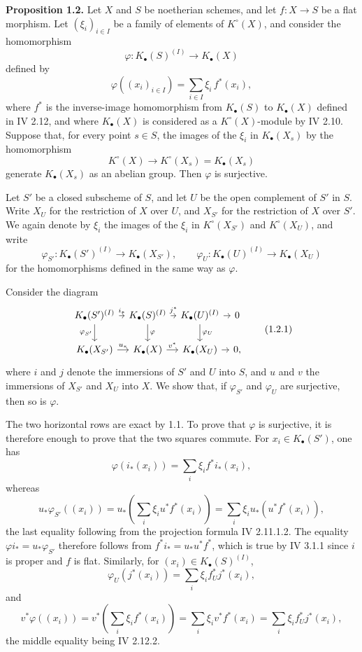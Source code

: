 \textbf{Proposition 1.2.} Let $X$ and $S$ be noetherian schemes, and let $f:X\to S$ be a flat morphism. Let $(\xi_i)_{i\in I}$ be a family of elements of $K^\circ(X)$, and consider the homomorphism
\[
 \varphi:K_\bullet(S)^{(I)}\longrightarrow K_\bullet(X)
\]
defined by
\[
 \varphi((x_i)_{i\in I})=\sum_{i\in I}\xi_i\,f^*(x_i),
\]
where $f^*$ is the inverse-image homomorphism from $K_\bullet(S)$ to $K_\bullet(X)$ defined in IV 2.12, and where $K_\bullet(X)$ is considered as a $K^\circ(X)$-module by IV 2.10. Suppose that, for every point $s\in S$, the images of the $\xi_i$ in $K_\bullet(X_s)$ by the homomorphism
\[
 K^\circ(X)\longrightarrow K^\circ(X_s)=K_\bullet(X_s)
\]
generate $K_\bullet(X_s)$ as an abelian group. Then $\varphi$ is surjective.

Let $S'$ be a closed subscheme of $S$, and let $U$ be the open complement of $S'$ in $S$. Write $X_U$ for the restriction of $X$ over $U$, and $X_{S'}$ for the restriction of $X$ over $S'$. We again denote by $\xi_i$ the images of the $\xi_i$ in $K^\circ(X_{S'})$ and $K^\circ(X_U)$, and write
\[
 \varphi_{S'}:K_\bullet(S')^{(I)}\to K_\bullet(X_{S'}),\qquad
 \varphi_U:K_\bullet(U)^{(I)}\to K_\bullet(X_U)
\]
for the homomorphisms defined in the same way as $\varphi$.

Consider the diagram
\[
\begin{tikzcd}[column sep=tiny]
K_\bullet(S')^{(I)} \arrow[r,"i_*"] \arrow[d,"\varphi_{S'}"'] &
K_\bullet(S)^{(I)} \arrow[r,"j^*"] \arrow[d,"\varphi"] &
K_\bullet(U)^{(I)} \arrow[r] \arrow[d,"\varphi_U"] & 0\\
K_\bullet(X_{S'}) \arrow[r,"u_*"] & K_\bullet(X) \arrow[r,"v^*"] & K_\bullet(X_U) \arrow[r] & 0,
\end{tikzcd}\tag{1.2.1}
\]
where $i$ and $j$ denote the immersions of $S'$ and $U$ into $S$, and $u$ and $v$ the immersions of $X_{S'}$ and $X_U$ into $X$. We show that, if $\varphi_{S'}$ and $\varphi_U$ are surjective, then so is $\varphi$.

The two horizontal rows are exact by 1.1. To prove that $\varphi$ is surjective, it is therefore enough to prove that the two squares commute. For $x_i\in K_\bullet(S')$, one has
\[
 \varphi(i_*(x_i))=\sum_i \xi_i f^*i_*(x_i),
\]
whereas
\[
 u_*\varphi_{S'}((x_i))=u_*\left(\sum_i\xi_i u^*f^*(x_i)\right)=\sum_i \xi_i u_*(u^*f^*(x_i)),
\]
the last equality following from the projection formula IV 2.11.1.2. The equality $\varphi i_*=u_*\varphi_{S'}$ therefore follows from $f^*i_*=u_*u^*f^*$, which is true by IV 3.1.1 since $i$ is proper and $f$ is flat. Similarly, for $(x_i)\in K_\bullet(S)^{(I)}$,
\[
 \varphi_U(j^*(x_i))=\sum_i\xi_i f_U^*j^*(x_i),
\]
and
\[
 v^*\varphi((x_i))=v^*\left(\sum_i\xi_i f^*(x_i)\right)=\sum_i\xi_i v^*f^*(x_i)=\sum_i\xi_i f_U^*j^*(x_i),
\]
the middle equality being IV 2.12.2.

